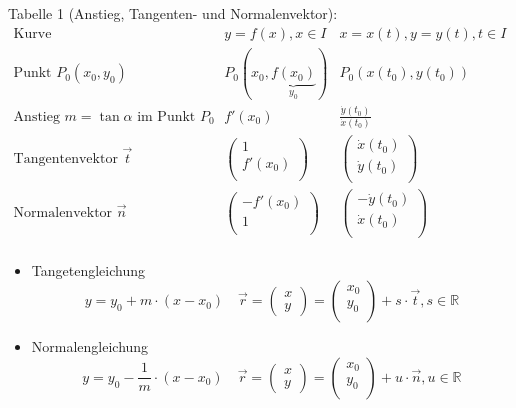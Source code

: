 \documentclass[a4paper]{scrartcl}
\begin{document}
Tabelle 1 (Anstieg, Tangenten- und Normalenvektor):\\
$\begin{array}{c|c|c}
\text{Kurve} & y=f(x), x \in I & x = x(t), y= y(t), t \in I\\  \hline
\text{Punkt } P_0(x_0,y_0) & P_0(x_0,\underbrace{f(x_0)}_{y_0}) & P_0(x(t_0),y(t_0))\\ \hline
\text{Anstieg } m=\tan{\alpha} \text{ im Punkt } P_0 & f'(x_0) & \frac{\dot{y}(t_0)}{\dot{x} (t_0)} \\  \hline
\text{Tangentenvektor } \vec{t} & \begin{pmatrix} 1 \\ f'(x_0) \\ \end{pmatrix} & \begin{pmatrix} \dot{x} (t_0) \\ \dot{y} (t_0)\\ \end{pmatrix} \\  \hline
\text{Normalenvektor } \vec{n} & \begin{pmatrix} -f'(x_0) \\ 1\\ \end{pmatrix} & \begin{pmatrix} - \dot{y} (t_0) \\ \dot{x} (t_0) \\ \end{pmatrix}\\
\end{array}$

\begin{itemize}
\item Tangetengleichung
\[ y=y_0 + m \cdot (x-x_0) \quad \vec{r} = \begin{pmatrix} x \\ y \end{pmatrix} = \begin{pmatrix} x_0 \\ y_0 \\ \end{pmatrix} + s \cdot \vec{t}, s \in \mathbb{R} \]
\item Normalengleichung
\[ y = y_0 - \frac{1}{m} \cdot (x-x_0) \quad \vec{r} = \begin{pmatrix} x \\ y \end{pmatrix} = \begin{pmatrix} x_0 \\ y_0 \\ \end{pmatrix} + u \cdot \vec{n}, u \in \mathbb{R} \]
\end{itemize}
\end{document}
